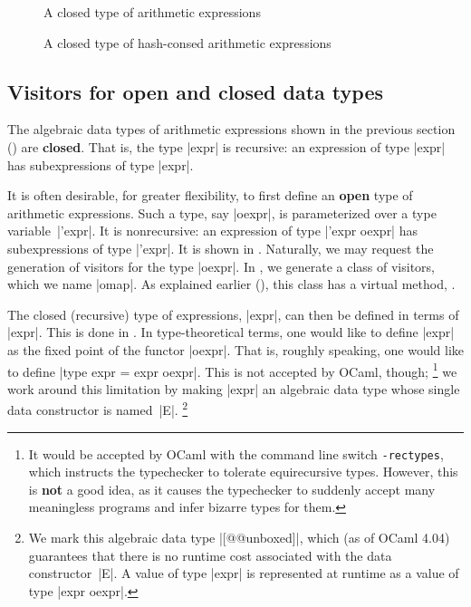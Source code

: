 \documentclass[11pt,a4paper,twoside]{article}
\renewcommand{\emph}[1]{\textbf{#1}}
\begin{document}
\begin{figure}[p]
\caption{A closed type of arithmetic expressions}
\label{fig:expr13}
\end{figure}

\begin{figure}[p]
\caption{A closed type of hash-consed arithmetic expressions}
\label{fig:expr08}
\end{figure}

\subsection{Visitors for open and closed data types}
\label{sec:advanced:openclosed}

The algebraic data types of arithmetic expressions shown in the previous
section () are \emph{closed}. That is, the type \oc|expr|
is recursive: an expression of type \oc|expr| has subexpressions of type
\oc|expr|.

It is often desirable, for greater flexibility, to first define an \emph{open}
type of arithmetic expressions. Such a type, say \oc|oexpr|, is parameterized
over a type variable~\oc|'expr|. It is nonrecursive: an expression of type
\oc|'expr oexpr| has subexpressions of type \oc|'expr|. It is shown in
. Naturally, we may request the generation of visitors for
the type \oc|oexpr|. In , we generate a class of \map
visitors, which we name \oc|omap|. As explained earlier
(), this class has a virtual method,
.

The closed (recursive) type of expressions, \oc|expr|, can then be defined in
terms of \oc|expr|. This is done in . In type-theoretical
terms, one would like to define \oc|expr| as the fixed point of the functor
\oc|oexpr|.
That is, roughly speaking, one would like to define \oc|type expr = expr oexpr|.
This is not accepted by OCaml, though;%
%
\footnote{It would be accepted by OCaml with the command line switch
  \texttt{-rectypes}, which instructs the typechecker to tolerate
  equirecursive types. However, this is \emph{not} a good idea, as it causes
  the typechecker to suddenly accept many meaningless programs and infer
  bizarre types for them.}
%
we work around this limitation by making \oc|expr| an algebraic data type
whose single data constructor is named~\oc|E|.%
%
\footnote{We mark this algebraic data type \oc|[@@unboxed]|, which (as of
  OCaml 4.04) guarantees that there is no runtime cost associated with the
  data constructor~\oc|E|. A value of type \oc|expr| is represented at
  runtime as a value of type \oc|expr oexpr|.}
\end{document}
